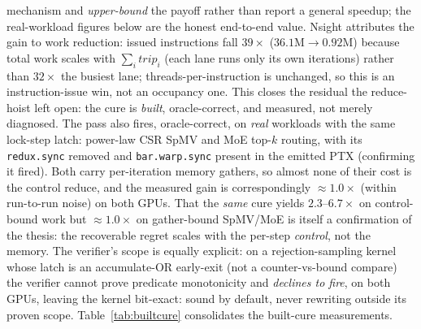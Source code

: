 \documentclass[sigplan,review,anonymous,10pt]{acmart}
\begin{document}
mechanism and \emph{upper-bound} the payoff rather than report a general speedup; the real-workload
figures below are the honest end-to-end value. Nsight attributes the gain to work reduction: issued instructions fall \textbf{$39\times$}
($36.1\mathrm{M}\rightarrow0.92\mathrm{M}$) because total work scales with $\sum_i \mathit{trip}_i$ (each
lane runs only its own iterations) rather than $32\times$ the busiest lane; threads-per-instruction is
unchanged, so this is an instruction-issue win, not an occupancy one. This closes the residual the
reduce-hoist left open: the cure is \emph{built}, oracle-correct, and measured, not merely diagnosed. The pass also fires, oracle-correct, on \emph{real} workloads with the same lock-step
latch: power-law CSR SpMV and MoE top-$k$ routing, with its \texttt{redux.sync} removed and
\texttt{bar.warp.sync} present in the emitted PTX (confirming it fired). Both carry per-iteration
memory gathers, so almost none of their cost is the control reduce, and the measured gain is
correspondingly ${\approx}1.0\times$ (within run-to-run noise) on both GPUs. That the \emph{same} cure
yields $2.3$--$6.7\times$ on control-bound work but ${\approx}1.0\times$ on gather-bound SpMV/MoE is
itself a confirmation of the thesis: the recoverable regret scales with the per-step \emph{control}, not
the memory. The verifier's scope is equally explicit: on a rejection-sampling kernel whose latch is an
accumulate-OR early-exit (not a counter-vs-bound compare) the verifier cannot prove predicate
monotonicity and \emph{declines to fire}, on both GPUs, leaving the kernel bit-exact: sound by default,
never rewriting outside its proven scope.
Table~\ref{tab:builtcure} consolidates the built-cure measurements.
\end{document}
